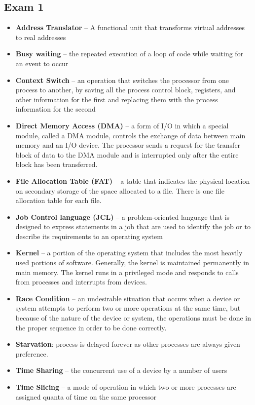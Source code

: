 \documentclass[fontsize=4.5pt]{scrartcl}
\begin{document}
\begin{multicols}{3}
    \subsection{Exam 1}
      \begin{itemize}
        \item \textbf{Address Translator} – A functional unit that transforms virtual addresses to real addresses
        \item \textbf{Busy waiting} – the repeated execution of a loop of code while waiting for an event to occur
        \item \textbf{Context Switch} – an operation that switches the processor from one process to another, by saving all the process control block, registers, and other information for the first and 
                                        replacing them with the process information for the second
        \item \textbf{Direct Memory Access (DMA)} – a form of I/O in which a special module, called a DMA module, controls the exchange of data between main memory and an I/O device.  
                                    The processor sends a request for the transfer block of data to the DMA module and is interrupted only after the entire block has been transferred.
        \item \textbf{File Allocation Table (FAT)} – a table that indicates the physical location on secondary storage of the space allocated to a file.  There is one file allocation table for each file.
        \item \textbf{Job Control language (JCL)} – a problem-oriented language that is designed to express statements in a job that are used to identify the job or to describe its requirements to an operating system
        \item \textbf{Kernel} – a portion of the operating system that includes the most heavily used portions of software.  Generally, the kernel is maintained permanently in main memory.  
                The kernel runs in a privileged mode and responds to calls from processes and interrupts from devices.
        \item \textbf{Race Condition} – an undesirable situation that occurs when a device or system attempts to perform two or more operations at the same time, but because of the nature of the device or system, 
        the operations must be done in the proper sequence in order to be done correctly.
        \item \textbf{Starvation}: process is delayed forever as other processes are always given preference.
        \item \textbf{Time Sharing} – the concurrent use of a device by a number of users
        \item \textbf{Time Slicing} – a mode of operation in which two or more processes are assigned quanta of time on the same processor
      \end{itemize}

\end{multicols}
\end{document}
